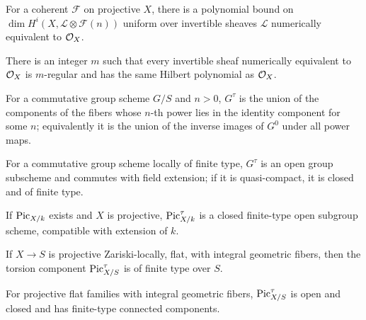 \begin{lemma}\label{fga-lem-9-6-5}
For a coherent $\mathcal F$ on projective $X$, there is a polynomial bound on
$\dim H^i(X,\mathcal L\otimes\mathcal F(n))$ uniform over invertible sheaves
$\mathcal L$ numerically equivalent to $\mathcal O_X$.
\end{lemma}
\begin{lemma}\label{fga-lem-9-6-6}
There is an integer $m$ such that every invertible sheaf numerically equivalent
to $\mathcal O_X$ is $m$-regular and has the same Hilbert polynomial as $\mathcal O_X$.
\end{lemma}
\begin{definition}\label{fga-def-9-6-8}
For a commutative group scheme $G/S$ and $n>0$, $G^{\tau}$ is the union of the
components of the fibers whose $n$-th power lies in the identity component for
some $n$; equivalently it is the union of the inverse images of $G^0$ under all
power maps.
\end{definition}
\begin{lemma}\label{fga-lem-9-6-9}
For a commutative group scheme locally of finite type, $G^\tau$ is an open group
subscheme and commutes with field extension; if it is quasi-compact, it is closed
and of finite type.
\end{lemma}
\begin{proposition}\label{fga-prop-9-6-12}
If $\operatorname{Pic}_{X/k}$ exists and $X$ is projective, $\operatorname{Pic}^\tau_{X/k}$ is a closed
finite-type open subgroup scheme, compatible with extension of $k$.
\end{proposition}
\begin{theorem}\label{fga-thm-9-6-16}
If $X\to S$ is projective Zariski-locally, flat, with integral geometric fibers,
then the torsion component $\operatorname{Pic}^\tau_{X/S}$ is of finite type over $S$.
\end{theorem}
\begin{corollary}\label{fga-cor-9-6-17}
For projective flat families with integral geometric fibers,
$\operatorname{Pic}^\tau_{X/S}$ is open and closed and has finite-type connected components.
\end{corollary}

